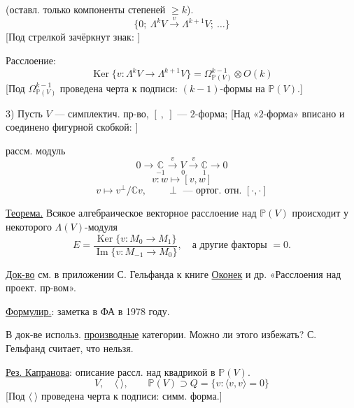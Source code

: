(оставл. только компоненты степеней $\ge k$).
\begin{equation*}
\{0;\ \Lambda^kV\overset{v}{\longrightarrow}\Lambda^{k+1}V;\ \ldots\}
\end{equation*}
[Под стрелкой зачёркнут знак:
]

Расслоение:
\begin{equation*}
\operatorname{Ker}\{v:\Lambda^kV\to\Lambda^{k+1}V\}
=\Omega^{k-1}_{\mathbb P(V)}\otimes O(k)
\end{equation*}
[Под $\Omega^{k-1}_{\mathbb P(V)}$ проведена черта к подписи:
$(k-1)$-формы на $\mathbb P(V)$.]

3) Пусть $V$ — симплектич. пр-во, $[\ ,\ ]$ — $2$-форма;
[Над «$2$-форма» вписано и соединено фигурной скобкой:
]

рассм. модуль
\begin{equation*}
0\to\underset{-1}{\mathbb C}\overset{v}{\longrightarrow}
\underset{0}{V}\overset{v}{\longrightarrow}\underset{1}{\mathbb C}\to0
\end{equation*}
\begin{equation*}
v:w\longmapsto[v,w]
\end{equation*}
\begin{equation*}
v\longmapsto v^{\perp}/\mathbb Cv,
\qquad\perp\text{ — ортог. отн. }[\cdot,\cdot]
\end{equation*}

\underline{Теорема.} Всякое алгебраическое векторное расслоение
над $\mathbb P(V)$ происходит у некоторого $\Lambda(V)$-модуля
\begin{equation*}
E=\frac{\operatorname{Ker}\{v:M_0\to M_1\}}
{\operatorname{Im}\{v:M_{-1}\to M_0\}},
\quad\text{а другие факторы }=0.
\end{equation*}


\underline{Док-во} см. в приложении С. Гельфанда
к книге \underline{Оконек} и др. «Расслоения над проект. пр-вом».

\underline{Формулир.}: заметка в ФА в 1978 году.

В док-ве использ. \underline{производные} категории. Можно ли этого
избежать? С. Гельфанд считает, что нельзя.

\underline{Рез. Капранова}: описание рассл. над квадрикой
в $\mathbb P(V)$.
\begin{equation*}
V,\quad\langle\ \rangle,\qquad
\mathbb P(V)\supset Q=\{v:\langle v,v\rangle=0\}
\end{equation*}
[Под $\langle\ \rangle$ проведена черта к подписи: симм. форма.]

